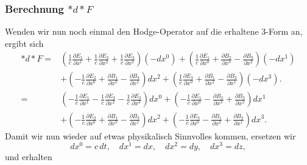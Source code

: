 \subsubsection{Berechnung $\ast d {\ast} F$}
Wenden wir nun noch einmal den Hodge-Operator auf die erhaltene 3-Form an, ergibt sich
\begin{align*}
	\ast d {\ast} F = 
	&\left( \frac{1}{c}\frac{\partial E_1}{\partial x^1} + \frac{1}{c}\frac{\partial E_2}{\partial x^2} + \frac{1}{c}\frac{\partial E_3}{\partial x^3} \right) (-dx^0) +
	\left(\frac{1}{c}\frac{\partial E_1}{\partial x^0} + \frac{\partial B_2}{\partial x^3} - \frac{\partial B_3}{\partial x^2} \right) (-dx^1)\\
	& + \left( -\frac{1}{c}\frac{\partial E_2}{\partial x^0} + \frac{\partial B_1}{\partial x^3} - \frac{\partial B_3}{\partial x^1} \right) dx^2 +
	\left( \frac{1}{c}\frac{\partial E_3}{\partial x^0} + \frac{\partial B_1}{\partial x^2} - \frac{\partial B_2}{\partial x^1} \right) (-dx^3).\\[2ex]
	=
	&\left( -\frac{1}{c}\frac{\partial E_1}{\partial x^1} -\frac{1}{c}\frac{\partial E_2}{\partial x^2} - \frac{1}{c}\frac{\partial E_3}{\partial x^3} \right) dx^0 +
	\left(-\frac{1}{c}\frac{\partial E_1}{\partial x^0} - \frac{\partial B_2}{\partial x^3} + \frac{\partial B_3}{\partial x^2} \right) dx^1\\
	& + \left( -\frac{1}{c}\frac{\partial E_2}{\partial x^0} + \frac{\partial B_1}{\partial x^3} - \frac{\partial B_3}{\partial x^1} \right) dx^2 +
	\left( -\frac{1}{c}\frac{\partial E_3}{\partial x^0} - \frac{\partial B_1}{\partial x^2} + \frac{\partial B_2}{\partial x^1} \right) dx^3.
\end{align*}
Damit wir nun wieder auf etwas physikalisch Sinnvolles kommen, ersetzen wir
\begin{equation}
	dx^0 = c\,dt, \quad dx^1 = dx, \quad dx^2 = dy, \quad dx^3 = dz,
\end{equation}
und erhalten
